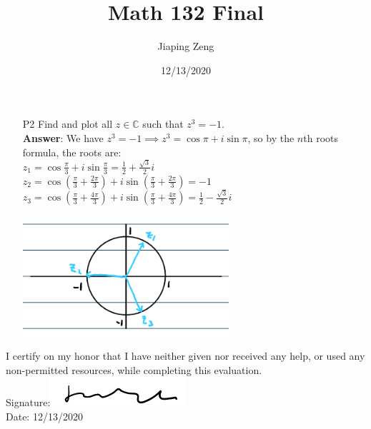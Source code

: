 \documentclass{article}
\title{Math 132 Final}
\author{Jiaping Zeng}
\date{12/13/2020}
\begin{document}

\newpage
\begin{itemize}
      \item [P2] Find and plot all $z\in\mathbb{C}$ such that $z^3=-1$.\\
            \textbf{Answer}: We have $z^3=-1\implies z^3=\cos\pi+i\sin\pi$, so by the $n$th roots formula, the roots are:\\
            $z_1=\cos\frac{\pi}{3}+i\sin\frac{\pi}{3}=\frac{1}{2}+\frac{\sqrt{3}}{2}i$\\
            $z_2=\cos(\frac{\pi}{3}+\frac{2\pi}{3})+i\sin(\frac{\pi}{3}+\frac{2\pi}{3})=-1$\\
            $z_3=\cos(\frac{\pi}{3}+\frac{4\pi}{3})+i\sin(\frac{\pi}{3}+\frac{4\pi}{3})=\frac{1}{2}-\frac{\sqrt{3}}{2}i$
            \begin{center}
                  \includegraphics[width=3in]{p2.png}
            \end{center}
\end{itemize}

\newpage
I certify on my honor that I have neither given nor received any help, or used any non-permitted resources, while completing this evaluation.\\
Signature:\includegraphics[width=2in]{signature.png}\\
Date: 12/13/2020
\end{document}

